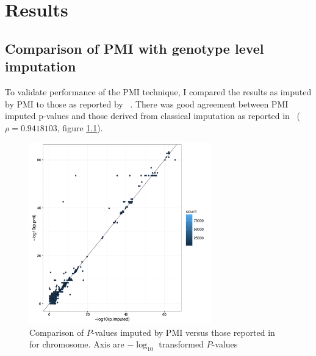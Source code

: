\documentclass[a4paper,11pt]{report}
\begin{document}


\chapter{Results}

\section{Comparison of PMI with genotype level imputation}

To validate performance of the PMI technique, I compared the results as imputed by PMI to those as reported by  ~\citep{Okada2014-um}. There was good agreement between PMI imputed p-values and those derived from classical imputation as reported in~\citet{Okada2014-um} ($\rho=0.9418103$, figure \ref{fig:pmi_comparison}). %

\begin{figure}[h]
\centering
\includegraphics[width=0.7\textwidth]{pmi_vs_imp.pdf}
\caption{Comparison of $P$-values imputed by PMI versus those reported in ~\citep{Okada2014-um} for chromosome. Axis are $-\log_{10}$ transformed $P$-values}
\label{fig:pmi_comparison}
\end{figure}
\end{document}

